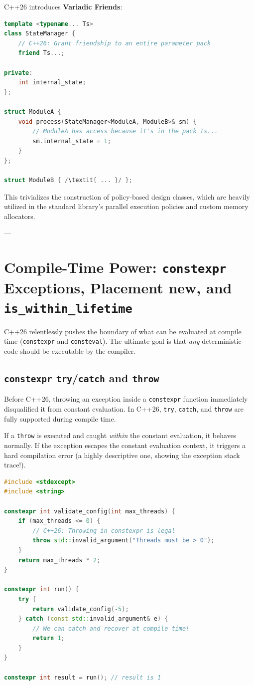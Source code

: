 C++26 introduces \textbf{Variadic Friends}:

\begin{lstlisting}[language=C++]
template <typename... Ts>
class StateManager {
    // C++26: Grant friendship to an entire parameter pack
    friend Ts...;
    
private:
    int internal_state;
};

struct ModuleA {
    void process(StateManager<ModuleA, ModuleB>& sm) {
        // ModuleA has access because it's in the pack Ts...
        sm.internal_state = 1; 
    }
};

struct ModuleB { /\textit{ ... }/ };
\end{lstlisting}

This trivializes the construction of policy-based design classes, which are heavily utilized in the standard library's parallel execution policies and custom memory allocators.

---

\section{Compile-Time Power: \texttt{constexpr} Exceptions, Placement new, and \texttt{is_within_lifetime}}

C++26 relentlessly pushes the boundary of what can be evaluated at compile time (\texttt{constexpr} and \texttt{consteval}). The ultimate goal is that \textit{any} deterministic code should be executable by the compiler.

\subsection{\texttt{constexpr} \texttt{try}/\texttt{catch} and \texttt{throw}}

Before C++26, throwing an exception inside a \texttt{constexpr} function immediately disqualified it from constant evaluation. In C++26, \texttt{try}, \texttt{catch}, and \texttt{throw} are fully supported during compile time.

If a \texttt{throw} is executed and caught \textit{within} the constant evaluation, it behaves normally. If the exception escapes the constant evaluation context, it triggers a hard compilation error (a highly descriptive one, showing the exception stack trace!).

\begin{lstlisting}[language=C++]
#include <stdexcept>
#include <string>

constexpr int validate_config(int max_threads) {
    if (max_threads <= 0) {
        // C++26: Throwing in constexpr is legal
        throw std::invalid_argument("Threads must be > 0");
    }
    return max_threads * 2;
}

constexpr int run() {
    try {
        return validate_config(-5);
    } catch (const std::invalid_argument& e) {
        // We can catch and recover at compile time!
        return 1;
    }
}

constexpr int result = run(); // result is 1
\end{lstlisting}

